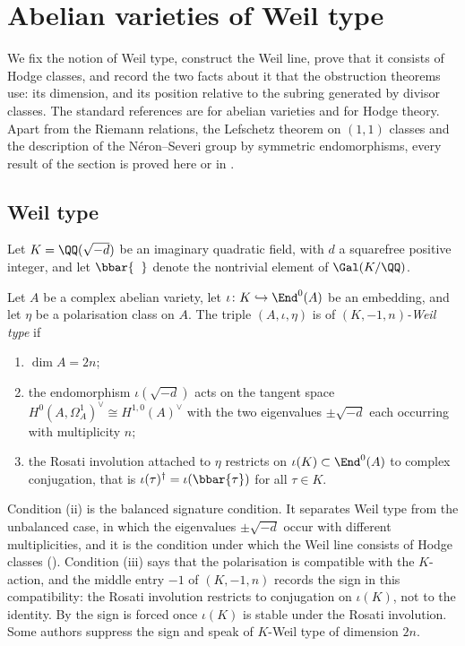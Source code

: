 \section{Abelian varieties of Weil type}\label{sec:weiltype}

We fix the notion of Weil type, construct the Weil line, prove that it
consists of Hodge classes, and record the two facts about it that the
obstruction theorems use: its dimension, and its position relative to the
subring generated by divisor classes. The standard references are \cite{BL04}
for abelian varieties and \cite{Voi02} for Hodge theory. Apart from the
Riemann relations, the Lefschetz theorem on $(1,1)$ classes and the
description of the N\'eron--Severi group by symmetric endomorphisms, every
result of the section is proved here or in .

\subsection{Weil type}

Let $K=\QQ(\sqrt{-d})$ be an imaginary quadratic field, with $d$ a squarefree
positive integer, and let $\bbar{\phantom{x}}$ denote the nontrivial element
of $\Gal(K/\QQ)$.

\begin{definition}\label{def:weiltype}
Let $A$ be a complex abelian variety, let
$\iota\colon K\hookrightarrow\End^{0}(A)$ be an embedding, and let $\eta$ be a
polarisation class on $A$. The triple $(A,\iota,\eta)$ is of
\emph{$(K,-1,n)$-Weil type} if
\begin{enumerate}[label=\textup{(\roman*)},nosep]
\item $\dim A=2n$;
\item the endomorphism $\iota(\sqrt{-d})$ acts on the tangent space
  $H^{0}(A,\Omega^{1}_{A})^{\vee}\cong H^{1,0}(A)^{\vee}$ with the two
  eigenvalues $\pm\sqrt{-d}$ each occurring with multiplicity $n$;
\item the Rosati involution attached to $\eta$ restricts on
  $\iota(K)\subset\End^{0}(A)$ to complex conjugation, that is
  $\iota(\tau)^{\dagger}=\iota(\bbar{\tau})$ for all $\tau\in K$.
\end{enumerate}
\end{definition}

Condition (ii) is the balanced signature condition. It separates Weil type
from the unbalanced case, in which the eigenvalues $\pm\sqrt{-d}$ occur with
different multiplicities, and it is the condition under which the Weil line
consists of Hodge classes (). Condition (iii) says that
the polarisation is compatible with the $K$-action, and the middle entry $-1$
of $(K,-1,n)$ records the sign in this compatibility: the Rosati involution
restricts to conjugation on $\iota(K)$, not to the identity. By
 the sign is forced once $\iota(K)$ is stable under the
Rosati involution. Some authors suppress the sign and speak of $K$-Weil type
of dimension $2n$.

